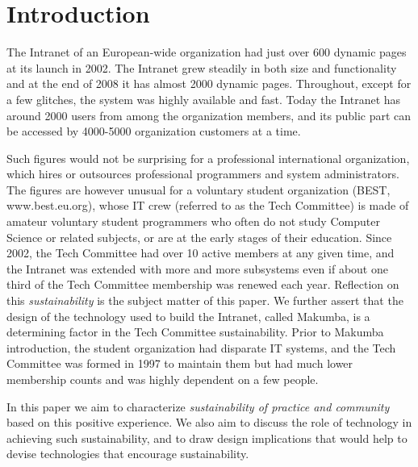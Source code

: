 \documentclass{sig-alt-release2}
\begin{document}


\section{Introduction}\label{sec:introduction}
The Intranet of an European-wide organization had just over 600 dynamic pages at its launch in 2002. The Intranet grew steadily in both size and functionality and at the end of 2008 it has almost 2000 dynamic pages. Throughout, except for a few glitches, the system was highly available and fast. Today the Intranet has around 2000 users from among the organization members, and its public part can be accessed by 4000-5000 organization customers at a time.

Such figures would not be surprising for a professional international organization, which hires or outsources professional programmers and system administrators. 
The figures are however unusual for a voluntary student organization (BEST, www.best.eu.org), whose IT crew (referred to as the Tech Committee) is made of amateur voluntary student programmers who often do not study Computer Science or related subjects, or are at the early stages of their education.  
Since 2002, the Tech Committee had over 10 active members at any given time, and the Intranet was extended with more and more subsystems even if about one third of the Tech Committee membership was renewed each year. Reflection on this {\it sustainability} is the subject matter of this paper. We further assert that the design of the technology used to build the Intranet, called Makumba, is a determining factor in the Tech Committee sustainability.
Prior to Makumba introduction, the student organization had disparate IT systems, and the Tech Committee was formed in 1997 to maintain them but had much lower membership counts and was highly dependent on a few people.

In this paper we aim to characterize {\it sustainability of practice and community} based on this positive experience. We also aim to discuss the role of technology in achieving such sustainability, and to draw design implications that would help to devise technologies that encourage sustainability. 
\end{document}
